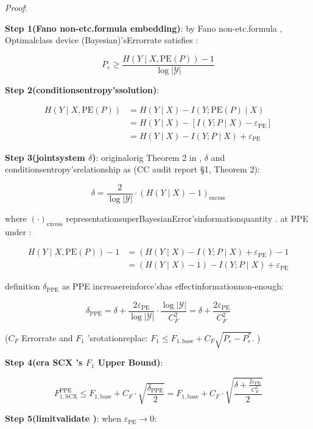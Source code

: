 \documentclass[
  12pt,
]{article}
\begin{document}
\emph{Proof}: 

\textbf{Step 1(Fano non-etc.formula embedding)}: by  Fano
non-etc.formula , Optimalclass device (Bayesian)'sErrorrate satisfies : 

\[P_e \geq \frac{H(Y \mid X, \text{PE}(P)) - 1}{\log |\mathcal{Y}|}\]

\textbf{Step 2(conditionsentropy'ssolution)}: 

\begin{align*}
H(Y \mid X, \text{PE}(P)) &= H(Y \mid X) - I(Y; \text{PE}(P) \mid X) \\
&= H(Y \mid X) - [I(Y; P \mid X) - \varepsilon_{\text{PE}}] \\
&= H(Y \mid X) - I(Y; P \mid X) + \varepsilon_{\text{PE}}
\end{align*}

\textbf{Step 3(jointsystem \(\delta\))}: originalorig Theorem 2 in , \(\delta\)
and conditionsentropy'srelationship as (CC audit report §1, Theorem 2):

\[\delta = \frac{2}{\log|\mathcal{Y}|} \cdot \left(H(Y \mid X) - 1\right)_{\text{excess}}\]

where \((\cdot)_{\text{excess}}\) representationsuperBayesianError'sinformationquantity . at  PPE under : 

\begin{align*}
H(Y \mid X, \text{PE}(P)) - 1 &= (H(Y \mid X) - I(Y; P \mid X) + \varepsilon_{\text{PE}}) - 1 \\
&= (H(Y \mid X) - 1) - I(Y; P \mid X) + \varepsilon_{\text{PE}}
\end{align*}

definition  \(\delta_{\text{PPE}}\) as  PPE increasereinforce'shas effectinformationnon-enough: 

\[\delta_{\text{PPE}} = \delta + \frac{2\varepsilon_{\text{PE}}}{\log|\mathcal{Y}|} \cdot \frac{\log|\mathcal{Y}|}{C_F^2} = \delta + \frac{2\varepsilon_{\text{PE}}}{C_F^2}\]

(\(C_F\) Errorrate and  \(F_1\)
'srotationreplac: \(F_1 \leq F_{1,\text{base}} + C_F \sqrt{P_e - P_e^*}\). )

\textbf{Step 4(era  SCX 's \(F_1\) Upper Bound)}: 

\[F_{1,\text{SCX}}^{\text{PPE}} \leq F_{1,\text{base}} + C_F \cdot \sqrt{\frac{\delta_{\text{PPE}}}{2}} = F_{1,\text{base}} + C_F \cdot \sqrt{\frac{\delta + \frac{2\varepsilon_{\text{PE}}}{C_F^2}}{2}}\]

\textbf{Step 5(limitvalidate )}: when  \(\varepsilon_{\text{PE}} \to 0\): 
\end{document}
